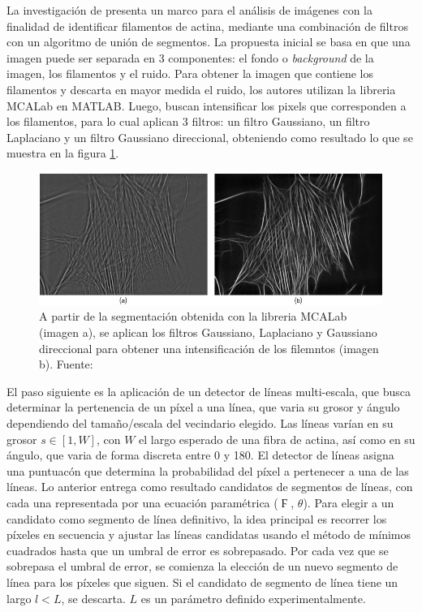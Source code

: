 \smallskip
La investigaci\'on de \cite{alioscha2016robust} presenta un marco para el an\'alisis de im\'agenes con la finalidad de identificar filamentos de actina, mediante una combinaci\'on de filtros con un algoritmo de uni\'on de segmentos. La propuesta inicial se basa en que una imagen puede ser separada en 3 componentes: el fondo o {\it background} de la imagen, los filamentos y el ruido. Para obtener la imagen que contiene los filamentos y descarta en mayor medida el ruido, los autores utilizan la libreria MCALab en MATLAB. Luego, buscan intensificar los pixels que corresponden a los filamentos, para lo cual aplican 3 filtros: un filtro Gaussiano, un filtro Laplaciano y un filtro Gaussiano direccional, obteniendo como resultado lo que se muestra en la figura \ref{fig:AlioshaRobust}.

\begin{figure}[t]
    \centering
    \includegraphics[scale=2]{imagenes/Aliosha2016-GaussLaplFilters.jpg}
    \caption{A partir de la segmentaci\'on obtenida con la libreria MCALab (imagen a), se aplican los filtros Gaussiano, Laplaciano y Gaussiano direccional para obtener una intensificaci\'on de los filemntos (imagen b). Fuente: \cite{alioscha2016robust}}
    \label{fig:AlioshaRobust}
\end{figure}

El paso siguiente es la aplicaci\'on de un detector de l\'ineas multi-escala, que busca determinar la pertenencia de un p\'ixel a una l\'inea, que varia su grosor y \'angulo dependiendo del tama\~no/escala del vecindario elegido. Las l\'ineas var\'ian en su grosor $s \in [1,W]$, con $W$ el largo esperado de una fibra de actina, as\'i como en su \'angulo, que varia de forma discreta entre 0 y 180\textdegree. El detector de l\'ineas asigna una puntuac\'on que determina la probabilidad del p\'ixel a pertenecer a una de las l\'ineas. Lo anterior entrega como resultado candidatos de segmentos de l\'ineas, con cada una representada por una ecuaci\'on param\'etrica ($\Digamma$, $\theta$). Para elegir a un candidato como segmento de l\'inea definitivo, la idea principal es recorrer los p\'ixeles en secuencia y ajustar las l\'ineas candidatas usando el m\'etodo de m\'inimos cuadrados hasta que un umbral de error es sobrepasado. Por cada vez que se sobrepasa el umbral de error, se comienza la elecci\'on de un nuevo segmento de l\'inea para los p\'ixeles que siguen. Si el candidato de segmento de l\'inea tiene un largo $l < L$, se descarta. $L$ es un par\'ametro definido experimentalmente.

